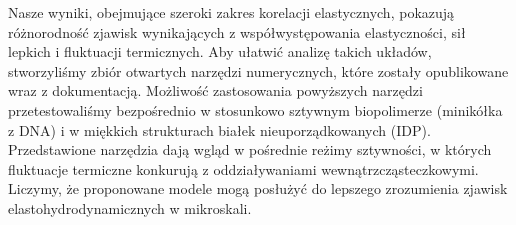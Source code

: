 Nasze wyniki, obejmujące szeroki zakres korelacji elastycznych, pokazują różnorodność zjawisk wynikających z współwystępowania elastyczności, sił lepkich i fluktuacji termicznych.
Aby ułatwić analizę takich układów, stworzyliśmy zbiór otwartych narzędzi numerycznych, które zostały opublikowane wraz z dokumentacją.
Możliwość zastosowania powyższych narzędzi przetestowaliśmy bezpośrednio w stosunkowo sztywnym biopolimerze (minikółka z DNA) i w miękkich strukturach białek nieuporządkowanych (IDP).
Przedstawione narzędzia dają wgląd w pośrednie reżimy sztywności, w których fluktuacje termiczne konkurują z oddziaływaniami wewnątrzcząsteczkowymi. Liczymy, że proponowane modele mogą posłużyć do lepszego zrozumienia zjawisk elastohydrodynamicznych w mikroskali.
